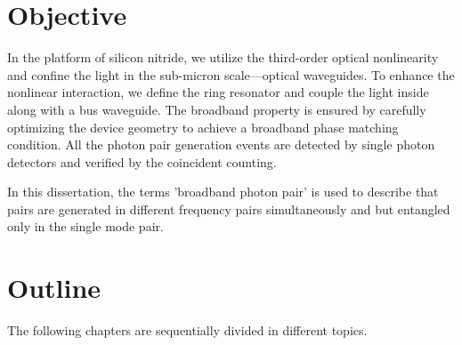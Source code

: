 \section{Objective}
In the platform of silicon nitride, we utilize the third-order optical nonlinearity and confine the light in the sub-micron scale---optical waveguides. To enhance the nonlinear interaction, we define the ring resonator and couple the light inside along with a bus waveguide. The broadband property is ensured by carefully optimizing the device geometry to achieve a broadband phase matching condition. All the photon pair generation events are detected by single photon detectors and verified by the coincident counting.

In this dissertation, the terms 'broadband photon pair' is used to describe that pairs are generated in different frequency pairs simultaneously and but entangled only in the single mode pair. 

\section{Outline}
The following chapters are sequentially divided in different topics.

